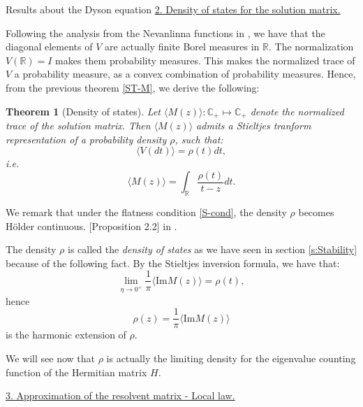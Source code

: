\documentclass[11pt, a4paper, oneside]{book}
\numberwithin{equation}{chapter}
\newtheorem{thm}{Theorem}[section]
\begin{document}
\begin{section}{Results about the Dyson equation}
\underline{2. Density of states for the solution matrix.}

Following the analysis from the Nevanlinna functions in \cite{gesztesy2000matrix}, we have that the diagonal elements of $V$ are actually finite Borel measures in $\mathbb{R}$. The normalization $V(\mathbb{R})=I$ makes them probability measures. This makes the normalized trace of $V$ a probability measure, as a convex combination of probability measures. Hence, from the previous theorem \ref{ST-M}, we derive the following:
%
\begin{thm}[Density of states] \label{States-d}
    Let $\langle M(z) \rangle : \mathbb{C}_+ \mapsto \mathbb{C}_+$ denote the normalized trace of the solution matrix. Then $\langle M(z) \rangle$ admits a Stieltjes tranform representation of a probability density $\rho$, such that:
    \[
    \langle V(dt) \rangle = \rho(t) dt,
    \]
    i.e.
    \[
    \langle M(z) \rangle = \int_{\mathbb{R}} \frac{\rho(t)}{t - z} dt .
    \]
\end{thm}
%
We remark that under the flatness condition \eqref{S-cond}, the density $\rho$ becomes Hölder continuous. [Proposition 2.2] in \cite{ajanki2019stability}. 

The density $\rho$ is called the \textit{density of states} as we have seen in section \ref{s:Stability} because of the following fact. By the Stieltjes inversion formula, we have that:
\[
 \lim \limits_{\eta \to 0^+} \frac{1}{\pi} \langle \mathrm{Im} M(z) \rangle = \rho(t),
\]
 hence $$ \rho(z) = \frac{1}{\pi} \langle \mathrm{Im} M(z) \rangle $$ is the harmonic extension of $\rho$.

 We will see now that $\rho$ is actually the limiting density for the eigenvalue counting function of the Hermitian matrix $H$.
 
\underline{3. Approximation of the resolvent matrix - Local law.}


\end{section}
\end{document}
